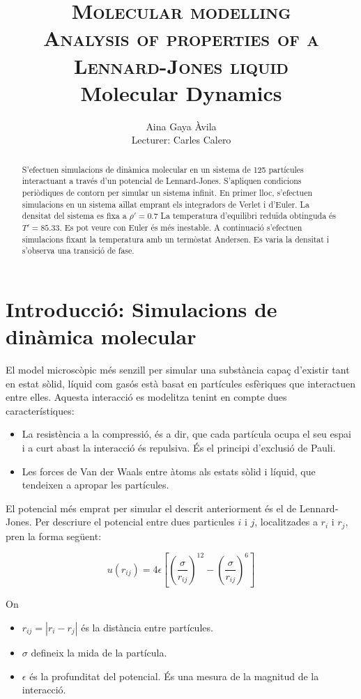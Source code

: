 \documentclass[a4paper,10pt]{article}
\title{\textsc{{\large Molecular modelling } \\ Analysis of properties of a Lennard-Jones liquid } \\  {\small Molecular Dynamics}}
\author{Aina Gaya Àvila \\ {\small Lecturer: Carles Calero }}
\begin{document}
		
\maketitle

\begin{abstract}
	S'efectuen simulacions de dinàmica molecular en un sistema de 125 partícules interactuant a través d'un potencial de Lennard-Jones. S'apliquen condicions periòdiques de contorn per simular un sistema infinit. En primer lloc, s'efectuen simulacions en un sistema aïllat emprant els integradors de Verlet i d'Euler. La densitat del sistema es fixa a $\rho' = 0.7$ La temperatura d'equilibri reduïda obtinguda és $T' = 85.33$. Es pot veure con Euler és més inestable. A continuació s'efectuen simulacions fixant la temperatura amb un termòstat Andersen. Es varia la densitat i s'observa una transició de fase. 
\end{abstract}

\section{Introducció: Simulacions de dinàmica molecular}
El model microscòpic més senzill per simular una substància capaç d'existir tant en estat sòlid, líquid com gasós està basat en partícules esfèriques que interactuen entre elles. Aquesta interacció es modelitza tenint en compte dues característiques:
\begin{itemize}
	\item La resistència a la compressió, és a dir, que cada partícula ocupa el seu espai i a curt abast la interacció és repulsiva. És el principi d'exclusió de Pauli.
	\item Les forces de Van der Waals entre àtoms als estats sòlid i líquid, que tendeixen a apropar les partícules.
\end{itemize}

El potencial més emprat per simular el descrit anteriorment és el de Lennard-Jones. Per descriure el potencial entre dues particules $i$ i $j$, localitzades a $r_i$ i $r_j$, pren la forma següent:

$$ u(r_{ij}) = 4 \epsilon \left[ \left( \frac{\sigma}{r_{ij}}\right)^{12} - \left( \frac{\sigma}{r_{ij}}\right)^{6} \right] $$

On 

\begin{itemize}
	\item $r_{ij} = | r_i - r_j | $ és la distància entre partícules.
	\item $\sigma$ defineix la mida de la partícula.
	\item $\epsilon$ és la profunditat del potencial. És una mesura de la magnitud de la interacció.
\end{itemize}
\end{document}
